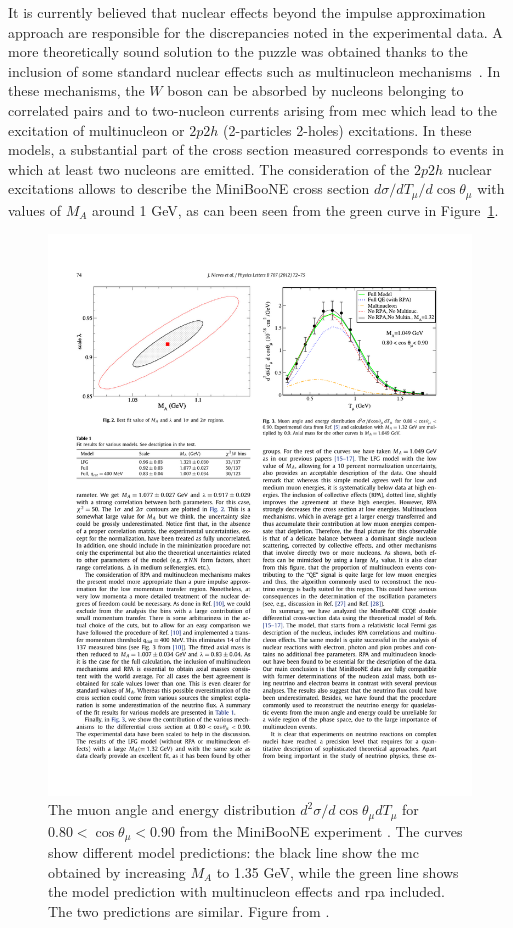 It is currently believed that nuclear effects beyond the impulse approximation approach are responsible for the discrepancies noted in the experimental data. A more theoretically sound solution to the puzzle was obtained thanks to the inclusion of some standard nuclear effects such as multinucleon mechanisms~\cite{nieves_ma}.
In these mechanisms, the $W$ boson can be absorbed by nucleons belonging to correlated pairs and to two-nucleon currents arising from \acrfull{mec} which lead to the excitation of multinucleon or $2p2h$ (2-particles 2-holes) excitations. In these models, a substantial part of the cross section measured corresponds to events in which at least two nucleons are emitted.
The consideration of the $2p2h$ nuclear excitations allows to describe the MiniBooNE cross section $d\sigma/dT_\mu/d\cos\theta_\mu$ with values of $M_A$ around 1 GeV, as can been seen from the green curve in Figure~\ref{fig:miniboone_ma}.

\begin{figure}[]
\centering
\includegraphics[width=.7\textwidth]{images/NeutrinoInteractions/miniboone_ma}
\caption[MiniBooNE Cross Section and Predictions]{The muon angle and energy distribution $d^2\sigma/d\cos\theta_\mu dT_\mu$ for $0.80 < \cos\theta_\mu < 0.90$ from the MiniBooNE experiment \cite{miniboone}. The curves show different model predictions: the black line show the \acrshort{mc} obtained by increasing $M_A$ to 1.35 GeV, while the green line shows the model prediction with multinucleon effects and \acrshort{rpa} included. The two predictions are similar. Figure from \cite{nieves_ma}.}
\label{fig:miniboone_ma}
\end{figure}

